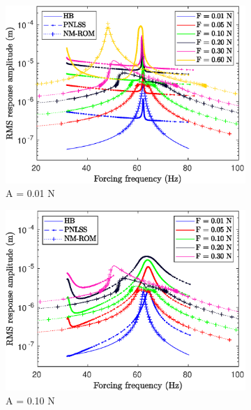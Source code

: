 \documentclass[aspectratio=169]{beamer}
\begin{document}
\begin{frame}[allowframebreaks]
  \begin{figure}[!h]
    \centering
    \begin{subfigure}[!h]{0.2\linewidth}
      \includegraphics[width=\linewidth]{../../benchmark4/extabs_fig/b4_fresp_comp_pll_famp001_nx23}
      \caption{A = 0.01 N}
    \end{subfigure}%
    \begin{subfigure}[!h]{0.2\linewidth}
      \includegraphics[width=\linewidth]{../../benchmark4/extabs_fig/b4_fresp_comp_pll_famp01_nx23}
      \caption{A = 0.10 N}
    \end{subfigure}%
    \begin{subfigure}[!h]{0.2\linewidth}

\end{subfigure}
\end{figure}
\end{frame}
\end{document}
